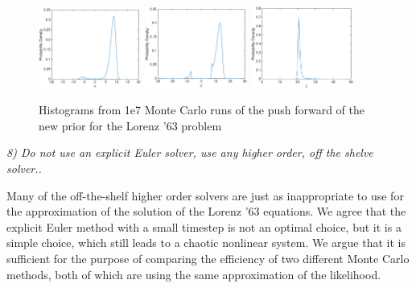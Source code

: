 \documentclass{article}
\newcommand{\comment}[2]{\vspace{0.6cm}{\bf Comment:} {\it #1.}

\vspace{0.3cm}{\bf Answer:} #2}
\begin{document}
\begin{figure}[htp]
\includegraphics[width=0.3\textwidth]{figures/xhist}
\includegraphics[width=0.3\textwidth]{figures/yhist}
\includegraphics[width=0.3\textwidth]{figures/zhist}
\caption{Histograms from 1e7 Monte Carlo runs of the push forward of the new prior for the Lorenz '63 problem}
  \end{figure}

  \comment{8) Do not use an explicit Euler solver, use any higher order, off the shelve solver.}{Many of the off-the-shelf higher order solvers are just as inappropriate to use for the approximation of the solution of the Lorenz '63 equations. We agree that the explicit Euler method with a small timestep is not an optimal choice, but it is a simple choice, which still leads to a chaotic nonlinear system. We argue that it is sufficient for the purpose of comparing the efficiency of two different Monte Carlo methods, both of which are using the same approximation of the likelihood.}

\end{document}

